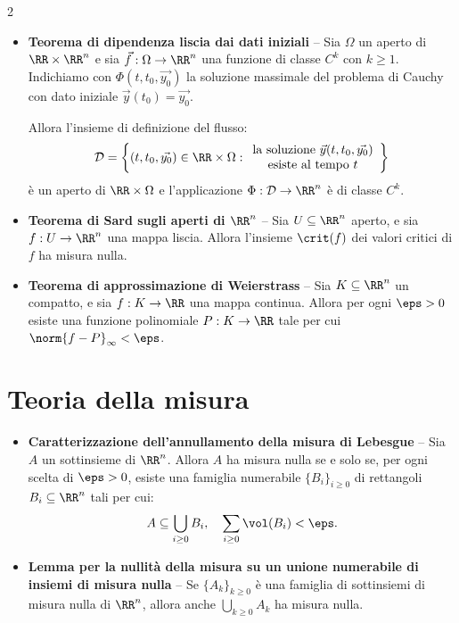 \begin{multicols*}{2}
\begin{itemize}
            \item \textbf{Teorema di dipendenza liscia dai dati iniziali} --
                  Sia $\Omega$ un aperto di $\RR \times \RR^n$ e sia $\vec{f} : \Omega \to \RR^n$ una funzione di classe
                  $C^k$ con $k \geq 1$. Indichiamo con $\Phi(t, t_0, \vec{y_0})$ la soluzione massimale del
                  problema di Cauchy con dato iniziale $\vec{y}(t_0) = \vec{y_0}$. \smallskip

                  Allora l'insieme di definizione del flusso:
                  \[
                        \mathcal{D} = \left\{ (t, t_0, \vec{y_0}) \in \RR \times \Omega :
                        \begin{array}{c}
                              \text{la soluzione } \vec{y}(t, t_0, \vec{y_0}) \\
                              \text{esiste al tempo } t
                        \end{array}
                        \right\}
                  \]
                  è un aperto di $\RR \times \Omega$ e l'applicazione $\Phi : \mathcal{D} \to \RR^n$ è di classe $C^k$.

            \item \textbf{Teorema di Sard sugli aperti di $\RR^n$} -- Sia $U \subseteq \RR^n$ aperto, e sia $f : U \to \RR^n$ una mappa
                  liscia. Allora l'insieme $\crit(f)$ dei valori critici di $f$ ha misura nulla.

            \item \textbf{Teorema di approssimazione di Weierstrass} -- Sia $K \subseteq \RR^n$ un compatto, e sia $f : K \to \RR$ una mappa
                  continua. Allora per ogni $\eps > 0$ esiste una funzione polinomiale $P : K \to \RR$ tale per cui $\norm{f-P}_\infty < \eps$.
      \end{itemize}

      \section*{Teoria della misura}

      \begin{itemize}
            \item \textbf{Caratterizzazione dell'annullamento della misura di Lebesgue} -- Sia $A$ un sottinsieme di $\RR^n$. Allora
                  $A$ ha misura nulla se e solo se, per ogni scelta di $\eps > 0$, esiste una famiglia numerabile $\{B_i\}_{i \geq 0}$
                  di rettangoli $B_i \subseteq \RR^n$ tali per cui:
                  \[ A \subseteq \bigcup_{i \geq 0} B_i, \quad \sum_{i \geq 0} \vol(B_i) < \eps. \]

            \item \textbf{Lemma per la nullità della misura su un unione numerabile di insiemi di misura nulla} -- Se $\{A_k\}_{k \geq 0}$
                  è una famiglia di sottinsiemi di misura nulla di $\RR^n$, allora anche $\bigcup_{k \geq 0} A_k$ ha misura nulla.

      \end{itemize}

\end{multicols*}